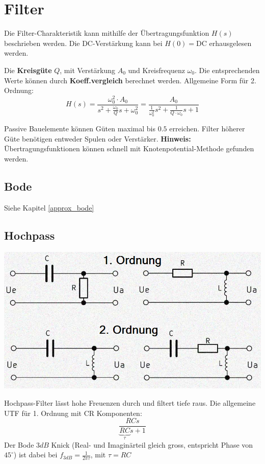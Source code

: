 \section{Filter}
Die Filter-Charakteristik kann mithilfe der Übertragungsfunktion $H(s)$ beschrieben werden. Die DC-Verstärkung kann bei $H(0) = \text{DC}$ erhausgelesen werden. 

Die \textbf{Kreisgüte} $Q$, mit Verstärkung $A_0$ und Kreisfrequenz $\omega_0$. Die entsprechenden Werte können durch \textbf{Koeff.vergleich} berechnet werden. Allgemeine Form für 2. Ordnung:
\[
H(s) = \frac{\omega_0^2 \cdot A_0}{s^2 + \frac{\omega_0}{Q}s + \omega_0^2} = \frac{A_0}{\frac{1}{\omega_0^2}s^2 + \frac{1}{Q\cdot \omega_0}s + 1}
\]

Passive Bauelemente können Güten maximal bis $0.5$ erreichen. Filter höherer Güte benötigen entweder Spulen oder Verstärker. \textbf{Hinweis:} Übertragungsfunktionen können schnell mit Knotenpotential-Methode gefunden werden.

\subsection{Bode}
Siehe Kapitel \ref{approx_bode}

\subsection{Hochpass}
\begin{minipage}{0.20\textwidth}
	\includegraphics[angle=90,origin=c,width=0.8\linewidth,keepaspectratio=true]{./Images/filter_hochpass}
\end{minipage}%
\begin{minipage}{0.30\textwidth}
	Hochpass-Filter lässt hohe Freuenzen durch und filtert tiefe raus. Die allgemeine UTF für 1. Ordnung mit CR Komponenten:
	\[
	\frac{RCs}{\underbrace{RC}_{\tau}s + 1}
	\]
	Der Bode $3dB$ Knick (Real- und Imaginärteil gleich gross, entspricht Phase von $45^\circ$) ist dabei bei $f_{3dB} = \frac{1}{2\pi\tau}$, mit $\tau = RC$
\end{minipage}


